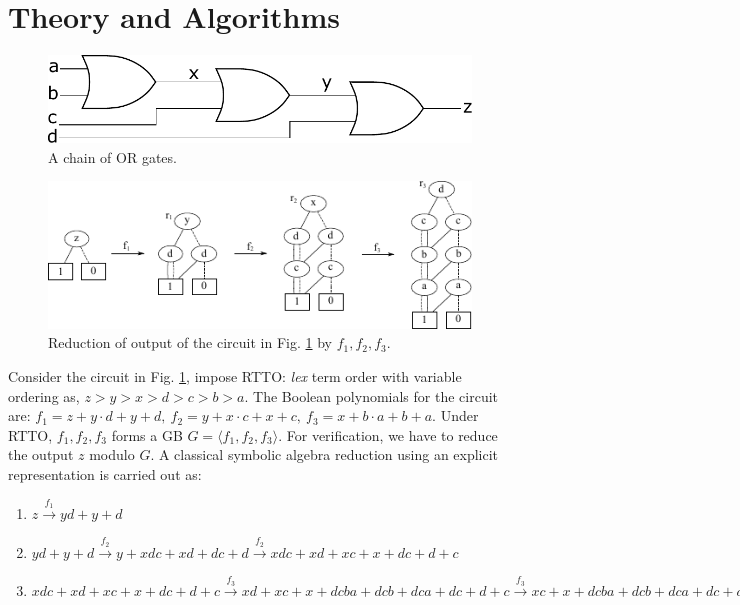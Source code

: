 \section{Theory and Algorithms}
\label{sec:theory}


\begin{figure}[hbt]
\centering
\includegraphics[scale=0.40]{Preliminaries-Theory/Chain_Or_Gates.pdf}
\caption{A chain of OR gates.}
\label{ChainOrGate}
\end{figure}

\begin{figure}[hbt]
\centering
\includegraphics[scale=1.4]{./Preliminaries-Theory/red_steps.pdf}
\caption{Reduction of output of the circuit in Fig. \ref{ChainOrGate} by $f_1,f_2,f_3$.}
\label{red_steps}
\end{figure}

Consider the circuit in Fig. \ref{ChainOrGate}, impose RTTO: {\it
  lex} term order with variable ordering as, $z>y>x>d>c>b>a$. The Boolean
polynomials for the circuit are: $f_1 = z + y\cdot d + y +d,
~f_2 = y + x\cdot c + x +c , ~f_3 = x + b\cdot a + b +a$.  Under RTTO,
$f_1, f_2, f_3$ forms a GB $G = \langle f_1,f_2,f_3 \rangle$. For verification, we have to reduce the
output $z$ modulo $G$. A classical symbolic algebra
 reduction using an explicit representation is carried out as: 

\begin{enumerate}
\item {\small $z \xrightarrow{f_1} y d +y +d$}
\item {\small $y d +y +d \xrightarrow{f_2} y + xdc + xd + dc + d \xrightarrow{f_2} xdc + xd + xc + x +dc + d + c$}
\item {\small $xdc + xd + xc + x +dc + d + c \xrightarrow{f_3} xd + xc + x  +
  dcba  + dcb + dca + dc + d + c \xrightarrow{f_3} xc + x + dcba +dcb
  + dca + dc + dba + db + da + d + c \xrightarrow{f_3} x  +dcba +dcb +
  dca + dc + dba + db + da + d + cba + cb + ca + c \xrightarrow{f_3}
  dcba +dcb + dca + dc + dba + db + da + d + cba + cb + ca + c + ba +
  b +a=r$}
\end{enumerate}


